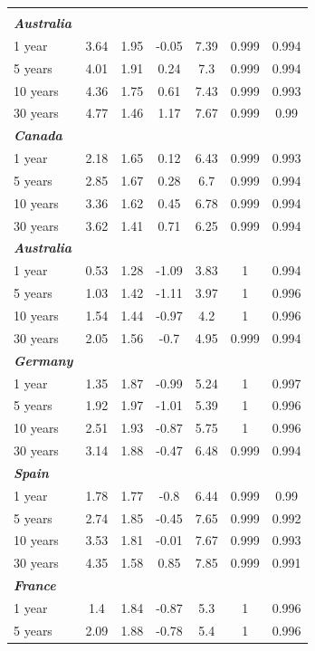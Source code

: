 \documentclass[12pt,bibliography=totoc]{article}
\begin{document}
\begin{appendices}
\begin{table}[H]
\begin{tabular}{l c c c c c c}
\hline       \\ [-1.5ex]           %
\textit{\textbf{Australia}} & & & & & & \\
1 year & 3.64 & 1.95 & -0.05 & 7.39 & 0.999 & 0.994\\
5 years & 4.01 & 1.91 & 0.24 & 7.3 & 0.999 & 0.994\\
10 years & 4.36 & 1.75 & 0.61 & 7.43 & 0.999 & 0.993\\
30 years & 4.77 & 1.46 & 1.17 & 7.67 & 0.999 & 0.99\\
\textit{\textbf{Canada}} & & & & & & \\
1 year & 2.18 & 1.65 & 0.12 & 6.43 & 0.999 & 0.993\\
5 years & 2.85 & 1.67 & 0.28 & 6.7 & 0.999 & 0.994\\
10 years & 3.36 & 1.62 & 0.45 & 6.78 & 0.999 & 0.994\\
30 years & 3.62 & 1.41 & 0.71 & 6.25 & 0.999 & 0.994\\
\textit{\textbf{Australia}} & & & & & & \\
1 year & 0.53 & 1.28 & -1.09 & 3.83 & 1 & 0.994\\
5 years & 1.03 & 1.42 & -1.11 & 3.97 & 1 & 0.996\\
10 years & 1.54 & 1.44 & -0.97 & 4.2 & 1 & 0.996\\
30 years & 2.05 & 1.56 & -0.7 & 4.95 & 0.999 & 0.994\\
\textit{\textbf{Germany}} & & & & & & \\
1 year & 1.35 & 1.87 & -0.99 & 5.24 & 1 & 0.997\\
5 years & 1.92 & 1.97 & -1.01 & 5.39 & 1 & 0.996\\
10 years & 2.51 & 1.93 & -0.87 & 5.75 & 1 & 0.996\\
30 years & 3.14 & 1.88 & -0.47 & 6.48 & 0.999 & 0.994\\
\textit{\textbf{Spain}} & & & & & & \\
1 year & 1.78 & 1.77 & -0.8 & 6.44 & 0.999 & 0.99\\
5 years & 2.74 & 1.85 & -0.45 & 7.65 & 0.999 & 0.992\\
10 years & 3.53 & 1.81 & -0.01 & 7.67 & 0.999 & 0.993\\
30 years & 4.35 & 1.58 & 0.85 & 7.85 & 0.999 & 0.991\\
\textit{\textbf{France}} & & & & & & \\
1 year & 1.4 & 1.84 & -0.87 & 5.3 & 1 & 0.996\\
5 years & 2.09 & 1.88 & -0.78 & 5.4 & 1 & 0.996\\

\end{tabular}
\end{table}
\end{appendices}
\end{document}
